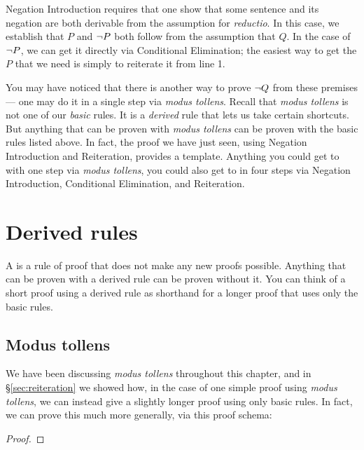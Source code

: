 Negation Introduction requires that one show that some sentence and its negation are both derivable from the assumption for \emph{reductio}. In this case, we establish that $P$ and $\neg P$ both follow from the assumption that $Q$. In the case of $\neg P$, we can get it directly via Conditional Elimination; the easiest way to get the $P$ that we need is simply to reiterate it from line 1.

You may have noticed that there is another way to prove $\neg Q$ from these premises --- one may do it in a single step via \emph{modus tollens}. Recall that \emph{modus tollens} is not one of our \emph{basic} rules. It is a \emph{derived} rule that lets us take certain shortcuts. But anything that can be proven with \emph{modus tollens} can be proven with the basic rules listed above. In fact, the proof we have just seen, using Negation Introduction and Reiteration, provides a template. Anything you could get to with one step via \emph{modus tollens}, you could also get to in four steps via Negation Introduction, Conditional Elimination, and Reiteration.

\section{Derived rules}

A  is a rule of proof that does not make any new proofs possible. Anything that can be proven with a derived rule can be proven without it. You can think of a short proof using a derived rule as shorthand for a longer proof that uses only the basic rules. 

\subsection{Modus tollens}

We have been discussing \emph{modus tollens} throughout this chapter, and in \S\ref{sec:reiteration} we showed how, in the case of one simple proof using \emph{modus tollens}, we can instead give a slightly longer proof using only basic rules. In fact, we can prove this much more generally, via this proof schema:



\begin{proof}
	 \want{\enot \metaB{}}
	\open
		 
	\close
\end{proof}

